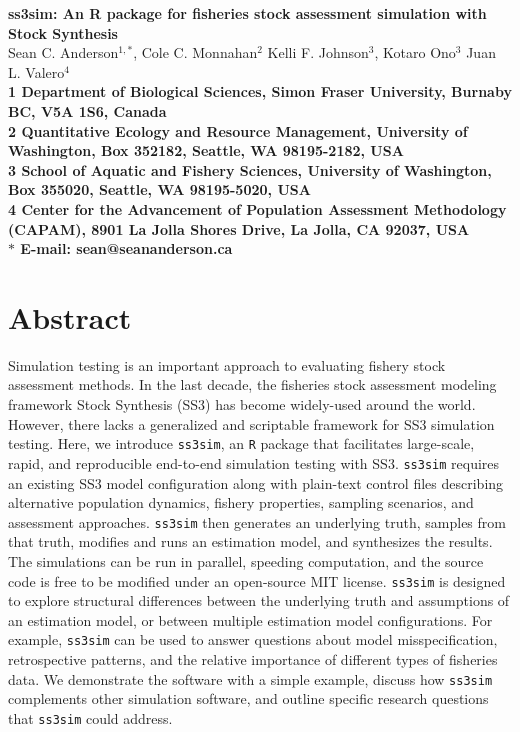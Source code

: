 \documentclass[11pt]{article}
\date{}
\begin{document}
\begin{flushleft}
{\Large
\textbf{ss3sim: An R package for fisheries stock assessment simulation with Stock Synthesis}
}
\\
Sean C. Anderson$^{1,\ast}$,
Cole C. Monnahan$^{2}$
Kelli F. Johnson$^{3}$,
Kotaro Ono$^{3}$
Juan L. Valero$^{4}$
\\
\bf{1} Department of Biological Sciences,
Simon Fraser University,
Burnaby BC, V5A 1S6, Canada
\\
\bf{2} Quantitative Ecology and Resource Management,
University of Washington, Box 352182,
Seattle, WA 98195-2182, USA
\\
\bf{3} School of Aquatic and Fishery Sciences,
University of Washington, Box 355020,
Seattle, WA 98195-5020, USA
\\
\bf{4} Center for the Advancement of Population Assessment Methodology
(CAPAM), 8901 La Jolla Shores Drive, La Jolla, CA 92037, USA
\\
$\ast$ E-mail: sean@seananderson.ca
\end{flushleft}



\section*{Abstract}

Simulation testing is an important approach to evaluating fishery stock assessment methods. In the last decade, the fisheries stock assessment modeling framework Stock Synthesis (SS3) has become widely-used around the world. However, there lacks a generalized and scriptable framework for SS3 simulation testing. Here, we introduce \texttt{ss3sim}, an \texttt{R} package that facilitates large-scale, rapid, and reproducible end-to-end simulation testing with SS3. \texttt{ss3sim} requires an existing SS3 model configuration along with plain-text control files describing alternative population dynamics, fishery properties, sampling scenarios, and assessment approaches. \texttt{ss3sim} then generates an underlying truth, samples from that truth, modifies and runs an estimation model, and synthesizes the results. The simulations can be run in parallel, speeding computation, and the source code is free to be modified under an open-source MIT license. \texttt{ss3sim} is designed to explore structural differences between the underlying truth and assumptions of an estimation model, or between multiple estimation model configurations. For example, \texttt{ss3sim} can be used to answer questions about model misspecification, retrospective patterns, and the relative importance of different types of fisheries data. We demonstrate the software with a simple example, discuss how \texttt{ss3sim} complements other simulation software, and outline specific research questions that \texttt{ss3sim} could address.
\end{document}

